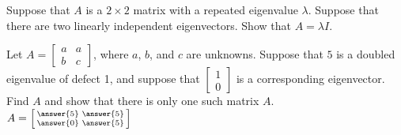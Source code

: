 \documentclass{ximera}
\begin{document}

\begin{exercise}
    Suppose that $A$ is a $2 \times 2$ matrix with a repeated eigenvalue $\lambda$. Suppose that there are two linearly independent eigenvectors.  Show that $A = \lambda I$.
\end{exercise}

\begin{exercise}%
    Let $A =
    \left[ 
        \begin{smallmatrix}
            a & a \\
            b & c
        \end{smallmatrix}
    \right]$, 
    where $a$, $b$, and $c$ are unknowns. Suppose that $5$ is a doubled eigenvalue of defect 1, and suppose that
    $\left[ 
        \begin{smallmatrix}
            1 \\ 
            0
        \end{smallmatrix}
    \right]$ 
    is a corresponding eigenvector.  Find $A$ and show that there is only one such matrix $A$.\\
        $A = \left[ \begin{smallmatrix}
            \answer{5} & \answer{5} \\ \answer{0} & \answer{5}
        \end{smallmatrix}\right]$
\end{exercise}
\end{document}
